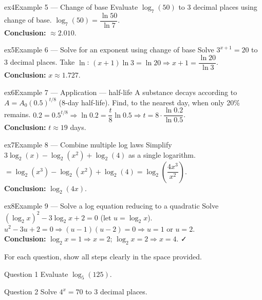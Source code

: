 \documentclass[11pt]{article}
\begin{document}
\begin{example}{ex4}{Example 5 --- Change of base}
Evaluate $\log_7(50)$ to 3 decimal places using change of base.\soln
$\log_7(50)=\dfrac{\ln50}{\ln7}$.\\[3pt]\textbf{Conclusion:} $\approx2.010$.
\end{example}

\begin{example}{ex5}{Example 6 --- Solve for an exponent using change of base}
Solve $3^{x+1}=20$ to 3 decimal places.\soln
Take $\ln$: $(x+1)\ln3=\ln20\Rightarrow x+1=\dfrac{\ln20}{\ln3}$.\\[3pt]\textbf{Conclusion:} $x\approx1.727$.
\end{example}

\begin{example}{ex6}{Example 7 --- Application --- half-life}
A substance decays according to $A=A_0(0.5)^{t/8}$ (8-day half-life). Find, to the nearest day, when only 20\% remains.\soln
$0.2=0.5^{t/8}\Rightarrow\ln0.2=\dfrac t8\ln0.5\Rightarrow t=8\cdot\dfrac{\ln0.2}{\ln0.5}$.\\[3pt]\textbf{Conclusion:} $t\approx19$ days.
\end{example}

\begin{example}{ex7}{Example 8 --- Combine multiple log laws}
Simplify $3\log_2(x)-\log_2(x^2)+\log_2(4)$ as a single logarithm.\soln
$=\log_2(x^3)-\log_2(x^2)+\log_2(4)=\log_2\!\left(\dfrac{4x^3}{x^2}\right)$.\\[3pt]\textbf{Conclusion:} $\log_2(4x)$.
\end{example}

\begin{example}{ex8}{Example 9 --- Solve a log equation reducing to a quadratic}
Solve $(\log_2x)^2-3\log_2x+2=0$ (let $u=\log_2x$).\soln
$u^2-3u+2=0\Rightarrow(u-1)(u-2)=0\Rightarrow u=1$ or $u=2$.\\[3pt]
\textbf{Conclusion:} $\log_2x=1\Rightarrow x=2$; $\log_2x=2\Rightarrow x=4$. ✓
\end{example}

\clearpage
{}
For each question, show all steps clearly in the space provided.

\begin{qbox}{Question 1}
Evaluate $\log_5(125)$.\workspace{2.4cm}
\end{qbox}

\begin{qbox}{Question 2}
Solve $4^x=70$ to 3 decimal places.\workspace{2.4cm}
\end{qbox}
\end{document}
